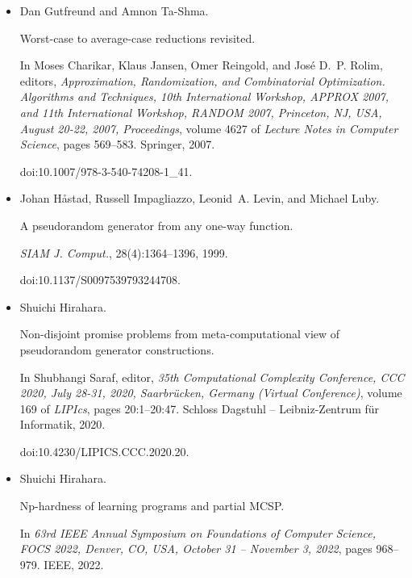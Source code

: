 \begin{itemize}
\item[] 
[13]

Dan Gutfreund and Amnon Ta-Shma.


Worst-case to average-case reductions revisited.


In Moses Charikar, Klaus Jansen, Omer Reingold, and José D. P.
Rolim, editors, \emph{Approximation, Randomization, and Combinatorial
Optimization. Algorithms and Techniques, 10th International Workshop,
APPROX 2007, and 11th International Workshop, RANDOM 2007, Princeton, NJ,
USA, August 20-22, 2007, Proceedings}, volume 4627 of \emph{Lecture Notes in
Computer Science}, pages 569–583. Springer, 2007.


doi:10.1007/978-3-540-74208-1\_41.





\item[] 
[14]

Johan Håstad, Russell Impagliazzo, Leonid A. Levin, and Michael Luby.


A pseudorandom generator from any one-way function.


\emph{SIAM J. Comput.}, 28(4):1364–1396, 1999.


doi:10.1137/S0097539793244708.





\item[] 
[15]

Shuichi Hirahara.


Non-disjoint promise problems from meta-computational view of
pseudorandom generator constructions.


In Shubhangi Saraf, editor, \emph{35th Computational Complexity
Conference, CCC 2020, July 28-31, 2020, Saarbrücken, Germany (Virtual
Conference)}, volume 169 of \emph{LIPIcs}, pages 20:1–20:47. Schloss Dagstuhl
– Leibniz-Zentrum für Informatik, 2020.


doi:10.4230/LIPICS.CCC.2020.20.





\item[] 
[16]

Shuichi Hirahara.


Np-hardness of learning programs and partial MCSP.


In \emph{63rd IEEE Annual Symposium on Foundations of Computer
Science, FOCS 2022, Denver, CO, USA, October 31 – November 3, 2022}, pages
968–979. IEEE, 2022.



\end{itemize}
